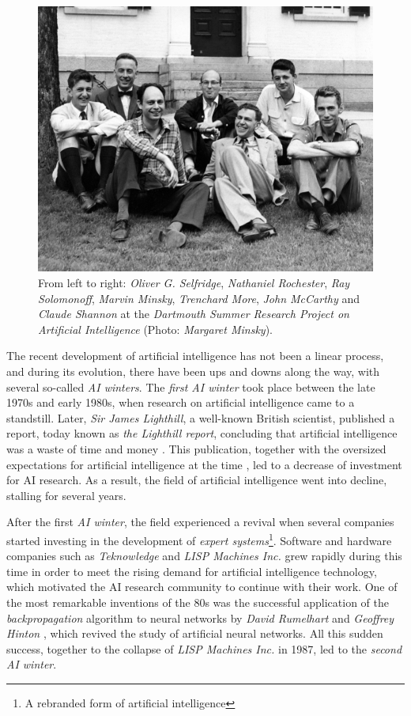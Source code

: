 \begin{figure}[h!]
	\centering
	\includegraphics[width=.6\textwidth]{introduction/images/dartmouth}
	\caption[\textit{Dartmouth Summer Research Project on Artificial Intelligence}]{From left to right: \textit{Oliver G. Selfridge}, \textit{Nathaniel Rochester}, \textit{Ray Solomonoff}, \textit{Marvin Minsky}, \textit{Trenchard More}, \textit{John McCarthy} and \textit{Claude Shannon} at the \textit{Dartmouth Summer Research Project on Artificial Intelligence} (Photo: \textit{Margaret Minsky}).}
	\label{fig:dartmouth_photo}
\end{figure}

The recent development of artificial intelligence has not been a linear process, and during its evolution, there have been ups and downs along the way, with several so-called \textit{AI winters}. The \textit{first AI winter} took place between the late 1970s and early 1980s, when research on artificial intelligence came to a standstill. Later, \textit{Sir James Lighthill}, a well-known British scientist, published a report, today known as \textit{the Lighthill report}, concluding that artificial intelligence was a waste of time and money \autocite{lighthillReport}. This publication, together with the oversized expectations for artificial intelligence at the time \autocite{russellNorvig}, led to a decrease of investment for AI research. As a result, the field of artificial intelligence went into decline, stalling for several years.

After the first \textit{AI winter}, the field experienced a revival when several companies started investing in the development of \textit{expert systems}\footnote{A rebranded form of artificial intelligence}. Software and hardware companies such as \textit{Teknowledge} and \textit{LISP Machines Inc.} grew rapidly during this time in order to meet the rising demand for artificial intelligence technology, which motivated the AI research community to continue with their work. One of the most remarkable inventions of the 80s was the successful application of the \textit{backpropagation} algorithm to neural networks by \textit{David Rumelhart} and \textit{Geoffrey Hinton} \autocite{hinton1986}, which revived the study of artificial neural networks. All this sudden success, together to the collapse of \textit{LISP Machines Inc.} in 1987, led to the \textit{second AI winter}.

